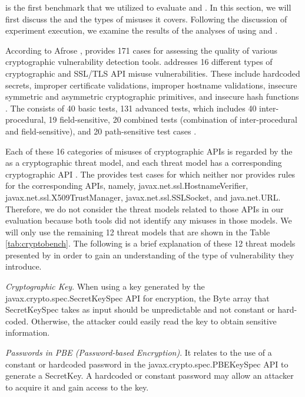 \cryptoapibench{} is the first benchmark that we utilized to evaluate \cognicryptsast and \codyze. In this section, we will first discuss the \cryptoapibench{} and the types of misuses it covers. Following the discussion of experiment execution, we examine the results of the analyses of \cryptoapibench{} using \codyze{} and \cognicryptsast. 

According to Afrose \etal  \cite{cryptoapibench}, \cryptoapibench{} provides 171 cases for assessing the quality of various cryptographic vulnerability detection tools. \cryptoapibench{} addresses 16 different types of cryptographic and SSL/TLS API misuse vulnerabilities. These include hardcoded secrets, improper certificate validations, improper hostname validations, insecure symmetric and asymmetric cryptographic primitives, and insecure hash functions \cite{cryptoapibench}. The \cryptoapibench{} consists of 40 basic tests, 131 advanced tests, which includes 40 inter-procedural, 19 field-sensitive, 20 combined tests (combination of inter-procedural and field-sensitive), and 20 path-sensitive test cases \cite{cryptoapibench}.

Each of these 16 categories of misuses of cryptographic APIs is regarded by the \cryptoapibench{} as a cryptographic threat model, and each threat model has a corresponding cryptographic API \cite{cryptoapibench}. The \cryptoapibench{} provides test cases for which neither \codyze{} nor \cognicryptsast{} provides rules for the corresponding APIs, namely, javax.net.ssl.HostnameVerifier, javax.net.ssl.X509TrustManager, javax.net.ssl.SSLSocket, and java.net.URL. Therefore, we do not consider the threat models related to those APIs in our evaluation because both tools did not identify any misuses in those models. We will only use the remaining 12 threat models that are shown in the Table \ref{tab:cryptobench}. The following is a brief explanation of these 12 threat models presented by \cryptoapibench{} in order to gain an understanding of the type of vulnerability they introduce.

\emph{Cryptographic Key}. When using a key generated by the javax.crypto.spec.SecretKeySpec API for encryption, the Byte array that SecretKeySpec takes as input should be unpredictable and not constant or hard-coded. Otherwise, the attacker could easily read the key to obtain sensitive information. 

\emph{Passwords in PBE (Password-based Encryption)}. It relates to the use of a constant or hardcoded password in the javax.crypto.spec.PBEKeySpec API to generate a SecretKey. A hardcoded or constant password may allow an attacker to acquire it and gain access to the key.

